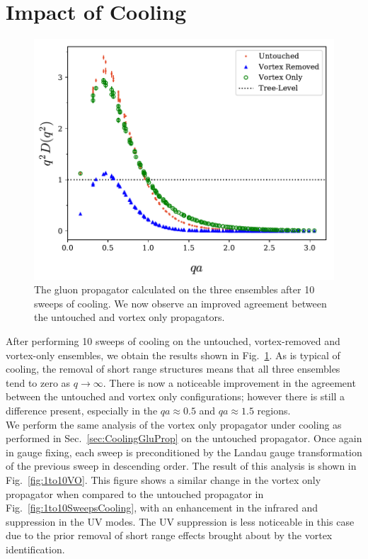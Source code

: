 \section{Impact of Cooling}

\begin{figure}[htb!]
\centering
\includegraphics[width=\linewidth]{./ScalarGluComp_q2_10sweepsAll.pdf}
\caption{\label{fig:10SweepsCooling}The gluon propagator calculated on the three ensembles after 10 sweeps of cooling. We now observe an improved agreement between the untouched and vortex only propagators.}
\end{figure}  
%
After performing 10 sweeps of cooling on the untouched, vortex-removed and vortex-only ensembles, we obtain the results shown in Fig.~\ref{fig:10SweepsCooling}. As is typical of cooling, the removal of short range structures means that all three ensembles tend to zero as $q\rightarrow\infty$. There is now a noticeable improvement in the agreement between the untouched and vortex only configurations; however there is still a difference present, especially in the $qa\approx0.5$ and $qa\approx1.5$ regions.\\

We perform the same analysis of the vortex only propagator under cooling as performed in Sec.~\ref{sec:CoolingGluProp} on the untouched propagator. Once again in gauge fixing, each sweep is preconditioned by the Landau gauge transformation of the previous sweep in descending order. The result of this analysis is shown in Fig.~\ref{fig:1to10VO}. This figure shows a similar change in the vortex only propagator when compared to the untouched propagator in Fig.~\ref{fig:1to10SweepsCooling}, with an enhancement in the infrared and suppression in the UV modes. The UV suppression is less noticeable in this case due to the prior removal of short range effects brought about by the vortex identification.\\

